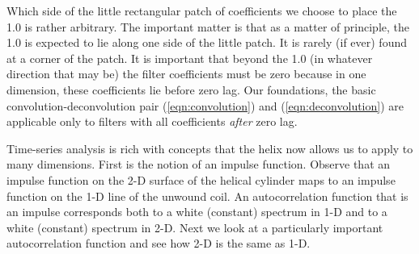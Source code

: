\par
Which side of the little rectangular patch of coefficients
we choose to place the 1.0 is rather arbitrary.
The important matter is that as a matter of principle,
the 1.0 is expected to lie along one side of the little patch.
It is rarely (if ever) found at a corner of the patch.
It is important that beyond the 1.0 (in whatever direction that may be)
the filter coefficients must be zero because in one dimension,
these coefficients lie before zero lag.
Our foundations,
the basic convolution-deconvolution pair
(\ref{eqn:convolution}) and
(\ref{eqn:deconvolution})
are applicable only to filters with all coefficients {\it after} zero lag.


\par
Time-series analysis is rich with concepts that
the helix now allows us to apply to many dimensions.
First is the notion of an impulse function.
Observe that an impulse function on the 2-D surface
of the helical cylinder maps to an impulse function
on the 1-D line of the unwound coil.
An autocorrelation function that is an impulse
corresponds both to a white (constant) spectrum in 1-D and
to a white (constant) spectrum in 2-D.
Next we look at a particularly important autocorrelation function
and see how 2-D is the same as 1-D.



